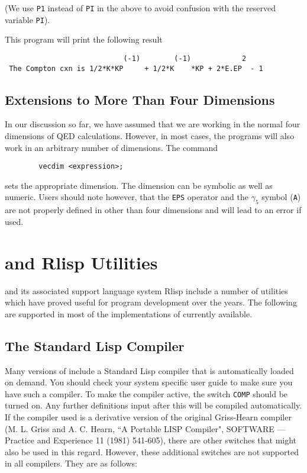 (We use {\tt P1} instead of {\tt PI} in the above to avoid confusion with
the reserved variable {\tt PI}).

This program will print the following result
\begin{verbatim}
                            (-1)        (-1)            2
 The Compton cxn is 1/2*K*KP     + 1/2*K    *KP + 2*E.EP  - 1
\end{verbatim}

\section{Extensions to More Than Four Dimensions}

In our discussion so far, we have assumed that we are working in the
normal four dimensions of QED calculations. However, in most cases, the
programs will also work in an arbitrary number of dimensions. The command
\begin{verbatim}
        vecdim <expression>;
\end{verbatim}
sets the appropriate dimension. The dimension can be symbolic as well as
numeric. Users should note however, that the {\tt EPS} operator and the
$\gamma_{5}$ symbol ({\tt A}) are not properly defined in other than four
dimensions and will lead to an error if used.

\chapter{{\REDUCE} and Rlisp Utilities}

{\REDUCE} and its associated support language system Rlisp 
include a number of utilities which have proved useful for program
development over the years.  The following are supported in most of the
implementations of {\REDUCE} currently available.

\section{The Standard Lisp Compiler}  

Many versions of {\REDUCE} include a Standard Lisp compiler that is
automatically loaded on demand.  You should check your system specific
user guide to make sure you have such a compiler.  To make the compiler
active, the switch {\tt COMP}  should be turned on.  Any
further definitions input after this will be compiled automatically.  If
the compiler used is a derivative version of the original Griss-Hearn
compiler
(M. L. Griss and A.
C. Hearn, ``A Portable LISP Compiler", SOFTWARE --- Practice and Experience
11 (1981) 541-605),
there are other switches that might also be
used in this regard.  However, these additional switches are not supported
in all compilers.  They are as follows:  

